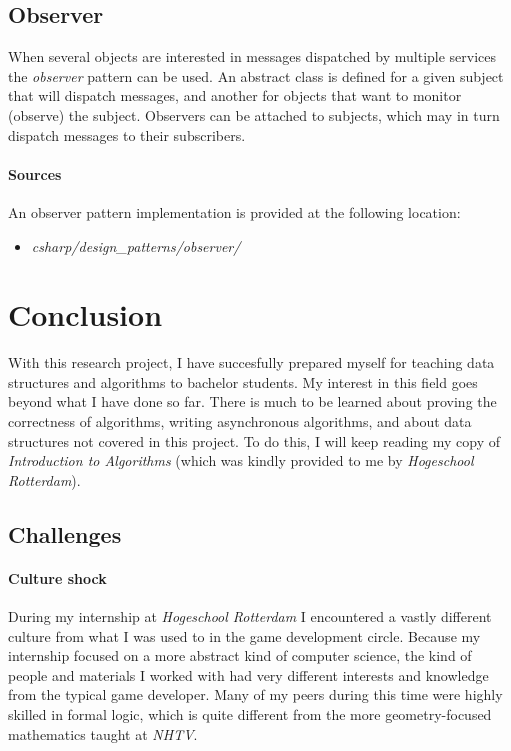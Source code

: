 \documentclass{article}
\begin{document}
\subsection{Observer}
When several objects are interested in messages dispatched by multiple services the {\em observer} pattern can be used.
An abstract class is defined for a given subject that will dispatch messages, and another for objects that want to monitor
(observe) the subject. Observers can be attached to subjects, which may in turn dispatch messages to their subscribers.

\begin{samepage}
  \paragraph{Sources}
  An observer pattern implementation is provided at the following location:
  \begin{itemize}
  \item{{\em csharp/design\_patterns/observer/}}
  \end{itemize}
\end{samepage}


\newpage


\section{Conclusion}
With this research project, I have succesfully prepared myself for teaching data structures and algorithms to bachelor students.
My interest in this field goes beyond what I have done so far. There is much to be learned about proving the correctness of
algorithms, writing asynchronous algorithms, and about data structures not covered in this project. To do this, I will keep
reading my copy of {\em Introduction to Algorithms} (which was kindly provided to me by {\em Hogeschool Rotterdam}).

\subsection{Challenges}
\paragraph{Culture shock}
During my internship at {\em Hogeschool Rotterdam} I encountered a vastly different culture from what I was used to in the game
development circle. Because my internship focused on a more abstract kind of computer science, the kind of people and materials
I worked with had very different interests and knowledge from the typical game developer. Many of my peers during this time were
highly skilled in formal logic, which is quite different from the more geometry-focused mathematics taught at {\em NHTV}.
\end{document}

